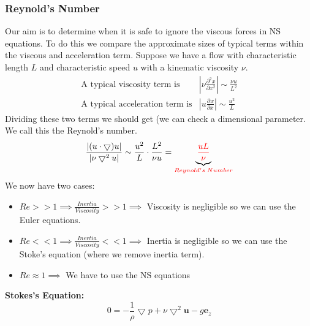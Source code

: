 \documentclass[11pt]{article}
\newcommand*{\pd}[3][]{\ensuremath{\frac{\partial^{#1} {#3}}{\partial {#3}^{#1}}}}
\newcommand{\grad}{\bigtriangledown}
\newenvironment{formula}
	{\begin{mdframed}[backgroundcolor=white, roundcorner=5pt, linewidth=1pt, linecolor=red]}
	{\end{mdframed}}
\newcommand{\mv}[1]{\textbf{#1}}
\newcommand{\mdf}[1]{{\color{red}#1}}
\begin{document}
\subsubsection{Reynold's Number}
Our aim is to determine when it is safe to ignore the viscous forces in NS equations.
To do this we compare the approximate sizes of typical terms within the viscous and acceleration term.
Suppose we have a flow with characteristic length $L$ and characteristic speed $u$ with a kinematic viscosity $\nu$.
\begin{align*}
	\text{A typical viscosity term is} &\left|\nu\pd[2]{u}{x}\right|\sim\frac{\nu u}{L^2}\\
	\text{A typical acceleration term is} &\left|u\pd{u}{x}\right|\sim\frac{u^2}{L}
\end{align*}
Dividing these two terms we should get (we can check a dimensional parameter. We call this the \mdf{Reynold's number}.
$$\frac{|(u\cdot\grad)u|}{|\nu\grad^2 u|}\sim \frac{u^2}{L}\cdot\frac{L^2}{\nu u}=\underbrace{\mdf{\frac{uL}{\nu}}}_{\mdf{Reynold's\;Number}}$$
We now have two cases:
\begin{itemize}
	\item $Re >> 1 \implies \frac{Inertia}{Viscosity} >> 1 \implies$ Viscosity is negligible so we can use the Euler equations.
	\item $Re << 1 \implies \frac{Inertia}{Viscosity} << 1 \implies$ Inertia is negligible so we can use the Stoke's equation (where we remove inertia term).
	\item $Re \approx 1 \implies$ We have to use the NS equations
\end{itemize}
\begin{formula}
	\textbf{Stokes's Equation:}
	$$0=-\frac{1}{\rho}\grad{p}+\nu\grad^2\mv{u}-g\mv{e}_z$$
\end{formula}
\end{document}
